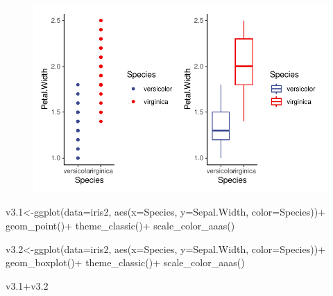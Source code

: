 \documentclass[
  letterpaper,
  DIV=11,
  numbers=noendperiod]{scrartcl}
\newenvironment{Shaded}{\begin{snugshade}}{\end{snugshade}}
\newcommand{\AttributeTok}[1]{\textcolor[rgb]{0.40,0.45,0.13}{#1}}
\newcommand{\FloatTok}[1]{\textcolor[rgb]{0.68,0.00,0.00}{#1}}
\newcommand{\FunctionTok}[1]{\textcolor[rgb]{0.28,0.35,0.67}{#1}}
\newcommand{\NormalTok}[1]{\textcolor[rgb]{0.00,0.23,0.31}{#1}}
\newcommand{\OtherTok}[1]{\textcolor[rgb]{0.00,0.23,0.31}{#1}}
\newcommand{\SpecialCharTok}[1]{\textcolor[rgb]{0.37,0.37,0.37}{#1}}
\begin{document}
\begin{figure}[H]

{\centering \includegraphics{cor_reg_chi_files/figure-pdf/unnamed-chunk-30-1.pdf}

}

\end{figure}

\begin{Shaded}
\begin{Highlighting}[]
\NormalTok{v3}\FloatTok{.1}\OtherTok{\textless{}{-}}\FunctionTok{ggplot}\NormalTok{(}\AttributeTok{data=}\NormalTok{iris2, }\FunctionTok{aes}\NormalTok{(}\AttributeTok{x=}\NormalTok{Species, }\AttributeTok{y=}\NormalTok{Sepal.Width, }\AttributeTok{color=}\NormalTok{Species))}\SpecialCharTok{+}
  \FunctionTok{geom\_point}\NormalTok{()}\SpecialCharTok{+}
  \FunctionTok{theme\_classic}\NormalTok{()}\SpecialCharTok{+}
  \FunctionTok{scale\_color\_aaas}\NormalTok{()}

\NormalTok{v3}\FloatTok{.2}\OtherTok{\textless{}{-}}\FunctionTok{ggplot}\NormalTok{(}\AttributeTok{data=}\NormalTok{iris2, }\FunctionTok{aes}\NormalTok{(}\AttributeTok{x=}\NormalTok{Species, }\AttributeTok{y=}\NormalTok{Sepal.Width, }\AttributeTok{color=}\NormalTok{Species))}\SpecialCharTok{+}
  \FunctionTok{geom\_boxplot}\NormalTok{()}\SpecialCharTok{+}
  \FunctionTok{theme\_classic}\NormalTok{()}\SpecialCharTok{+}
  \FunctionTok{scale\_color\_aaas}\NormalTok{()}

\NormalTok{v3}\FloatTok{.1}\SpecialCharTok{+}\NormalTok{v3}\FloatTok{.2}
\end{Highlighting}
\end{Shaded}
\end{document}
